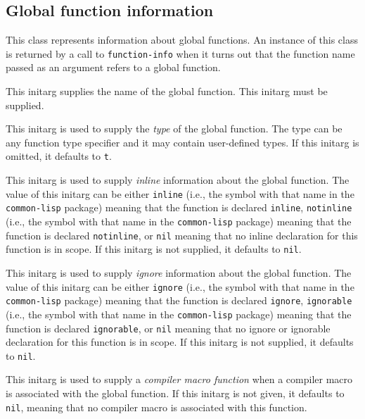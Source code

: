 \subsection{Global function information}


This class represents information about global functions.  An instance
of this class is returned by a call to \texttt{function-info} when it
turns out that the function name passed as an argument refers to a
global function.


This initarg supplies the name of the global function.  This initarg
must be supplied.


This initarg is used to supply the \emph{type} of the global function.
The type can be any function type specifier and it may contain
user-defined types.  If this initarg is omitted, it defaults to
\texttt{t}.


This initarg is used to supply \emph{inline} information about the
global function.  The value of this initarg can be either
\texttt{inline} (i.e., the symbol with that name in the
\texttt{common-lisp} package) meaning that the function is declared
\texttt{inline}, \texttt{notinline} (i.e., the symbol with that name
in the \texttt{common-lisp} package) meaning that the function is
declared \texttt{notinline}, or \texttt{nil} meaning that no inline
declaration for this function is in scope.  If this initarg is not
supplied, it defaults to \texttt{nil}.


This initarg is used to supply \emph{ignore} information about the
global function.  The value of this initarg can be either
\texttt{ignore} (i.e., the symbol with that name in the
\texttt{common-lisp} package) meaning that the function is declared
\texttt{ignore}, \texttt{ignorable} (i.e., the symbol with that name
in the \texttt{common-lisp} package) meaning that the function is
declared \texttt{ignorable}, or \texttt{nil} meaning that no ignore or
ignorable declaration for this function is in scope.  If this initarg
is not supplied, it defaults to \texttt{nil}.


This initarg is used to supply a \emph{compiler macro function} when
a compiler macro is associated with the global function.  If this
initarg is not given, it defaults to \texttt{nil}, meaning that no
compiler macro is associated with this function. 

